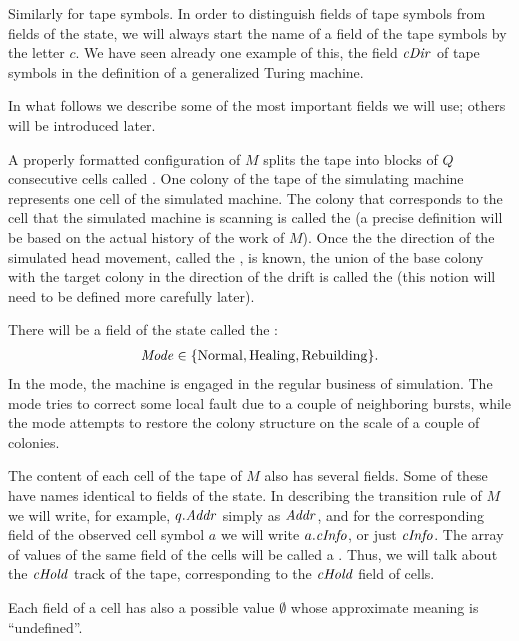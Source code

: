 \documentclass[12pt]{memoir}
\newcommand{\fld}[1]{\ensuremath{\textit{#1\/}}}
\newcommand{\Addr}{\fld{Addr}}
\newcommand{\cDir}{\fld{cDir}}
\newcommand{\cHold}{\fld{cHold}}
\newcommand{\cInfo}{\fld{cInfo}}
\newcommand{\Mode}{\fld{Mode}}
\newcommand{\Normal}{\mathrm{Normal}}
\newcommand{\Rebuilding}{\mathrm{Rebuilding}}
\newcommand{\Healing}{\mathrm{Healing}}
\begin{document}
Similarly for tape symbols.
In order to distinguish fields of tape symbols from fields of the state,
we will always start the name of a field of the tape symbols by the letter \( c \).
We have seen already one example of this, the field \( \cDir \) of tape symbols
in the definition of a generalized Turing machine.

In what follows we describe some of the most important fields we will use;
others will be introduced later.

A properly formatted configuration of \( M \) splits the tape into blocks of \( Q \)
consecutive cells called .
One colony of the tape of the simulating
machine represents one cell of the simulated machine.
The colony that corresponds to the cell that the
simulated machine is scanning is called the 
(a precise definition will be based on the actual history of the work of \( M \)).
Once the the direction of the simulated head movement, called the
, is known, the union of the base colony with the target colony in
the direction of the drift is called the  (this notion will 
need to be defined more carefully later).

There will be a field of the state called the :
 \begin{align*}
   \Mode\in\{ \Normal,\Healing, \Rebuilding \}.
 \end{align*}
In the  mode, the machine is engaged 
in the regular business of simulation.
The  mode tries to correct some local fault due to a couple of neighboring
bursts, while the  mode attempts to restore the colony structure
on the scale of a couple of colonies.

The content of each cell of the tape of \( M \) also has several fields.
Some of these have names identical to fields of the state.
In describing the transition rule of \( M \) we will write, for example,
\( q.\Addr \) simply as \( \Addr \), and for the corresponding field of the
observed cell symbol \( a \) we will write \( a.\cInfo \), or just \( \cInfo \).
The array of values of the same field of the cells will be called a .
Thus, we will talk about the \( \cHold \) track of the tape, corresponding to the
\( \cHold \) field of cells.

Each field of a cell has also a possible value
\( \emptyset \) whose approximate meaning is ``undefined''.
\end{document}
